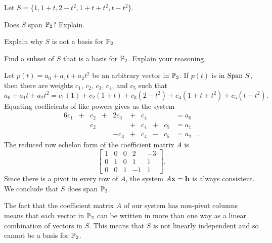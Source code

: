 \begin{example} Let $S = \{1, 1+t, 2-t^2, 1+t+t^2, t-t^2\}$. 
	\ba
	\item Does $S$ span $\mathbb{P}_2$? Explain.
	
	\item Explain why $S$ is not a basis for $\mathbb{P}_2$.
	
	\item Find a subset of $S$ that is a basis for $\mathbb{P}_2$. Explain your reasoning.
	
	\ea

\ExampleSolution
	\ba
	\item Let $p(t) = a_0+a_1t+a_2t^2$ be an arbitrary vector in $\mathbb{P}_2$. If $p(t)$ is in $\text{Span} \ S$, then there are weights $c_1$, $c_2$, $c_3$, $c_4$, and $c_5$ such that 
	\[a_0+a_1t+a_2t^2 = c_1(1) + c_2(1+t) + c_3(2-t^2) + c_4(1+t+t^2) + c_5(t-t^2).\]
	Equating coefficients of like powers gives us the system
	\begin{alignat*}{6}
{}c_1 	&{}+{} 	&{}c_2 	&{}+{}	&{2}c_3	&{}+{}	&{}c_4	&{}{}	&{} 		&= a_0&{} \\
{} 		&{}{} 		&{}c_2 	&{}{}		&{}		&{}+{}	&{}c_4	&{}+{}	&{}c_5 		&= a_1&{} \\
{} 		&{}{} 		&{} 		&{}{}		&{-}c_3	&{}+{}	&{}c_4	&{}-{}	&{}c_5 		&= a_2&{.} 
\end{alignat*}
The reduced row echelon form of the coefficient matrix $A$ is 
\[\left[ \begin{array}{cccrr} 1&0&0&2&-3 \\ 0&1&0&1&1 \\ 0&0&1&-1&1 \end{array} \right].\]
Since there is a pivot in every row of $A$, the system $A \mathbf{x} = \mathbf{b}$ is always consistent. We conclude that $S$ does span $\mathbb{P}_2$. 
	
	
	\item The fact that the coefficient matrix $A$ of our system has non-pivot columns means that each vector in $\mathbb{P}_2$ can be written in more than one way as a linear combination of vectors in $S$. This means that $S$ is not linearly independent and so cannot be a basis for $\mathbb{P}_2$.  
	
	\item %
	
	

\end{example}
